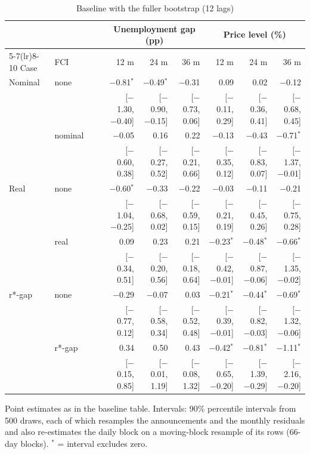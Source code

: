 \begin{table}[H]\centering\footnotesize\setlength{\tabcolsep}{2.2pt}
\caption{Baseline with the fuller bootstrap (12 lags)}\label{tab:fullboot}
\begin{tabular}{llcrrrrrrr}\toprule
 & & & & \multicolumn{3}{c}{Unemployment gap (pp)} & \multicolumn{3}{c}{Price level (\%)}\\ \cmidrule(lr){5-7}\cmidrule(lr){8-10}
Case & FCI & & & 12 m & 24 m & 36 m & 12 m & 24 m & 36 m\\ \midrule
Nominal & none & & & $-$0.81$^{*}$ & $-$0.49$^{*}$ & $-$0.31 & 0.09 & 0.02 & $-$0.12\\
 & & & & {\scriptsize [$-$1.30, $-$0.40]} & {\scriptsize [$-$0.90, $-$0.15]} & {\scriptsize [$-$0.73, 0.06]} & {\scriptsize [$-$0.11, 0.29]} & {\scriptsize [$-$0.36, 0.41]} & {\scriptsize [$-$0.68, 0.45]}\\
 & nominal & & & $-$0.05 & 0.16 & 0.22 & $-$0.13 & $-$0.43 & $-$0.71$^{*}$\\
 & & & & {\scriptsize [$-$0.60, 0.38]} & {\scriptsize [$-$0.27, 0.52]} & {\scriptsize [$-$0.21, 0.66]} & {\scriptsize [$-$0.35, 0.12]} & {\scriptsize [$-$0.83, 0.07]} & {\scriptsize [$-$1.37, $-$0.01]}\\
\addlinespace
Real & none & & & $-$0.60$^{*}$ & $-$0.33 & $-$0.22 & $-$0.03 & $-$0.11 & $-$0.21\\
 & & & & {\scriptsize [$-$1.04, $-$0.25]} & {\scriptsize [$-$0.68, 0.02]} & {\scriptsize [$-$0.59, 0.15]} & {\scriptsize [$-$0.21, 0.19]} & {\scriptsize [$-$0.45, 0.26]} & {\scriptsize [$-$0.75, 0.28]}\\
 & real & & & 0.09 & 0.23 & 0.21 & $-$0.23$^{*}$ & $-$0.48$^{*}$ & $-$0.66$^{*}$\\
 & & & & {\scriptsize [$-$0.34, 0.51]} & {\scriptsize [$-$0.20, 0.56]} & {\scriptsize [$-$0.18, 0.64]} & {\scriptsize [$-$0.42, $-$0.01]} & {\scriptsize [$-$0.87, $-$0.06]} & {\scriptsize [$-$1.35, $-$0.02]}\\
\addlinespace
r*-gap & none & & & $-$0.29 & $-$0.07 & 0.03 & $-$0.21$^{*}$ & $-$0.44$^{*}$ & $-$0.69$^{*}$\\
 & & & & {\scriptsize [$-$0.77, 0.12]} & {\scriptsize [$-$0.58, 0.34]} & {\scriptsize [$-$0.52, 0.48]} & {\scriptsize [$-$0.39, $-$0.01]} & {\scriptsize [$-$0.82, $-$0.03]} & {\scriptsize [$-$1.32, $-$0.06]}\\
 & r*-gap & & & 0.34 & 0.50 & 0.43 & $-$0.42$^{*}$ & $-$0.81$^{*}$ & $-$1.11$^{*}$\\
 & & & & {\scriptsize [$-$0.15, 0.85]} & {\scriptsize [$-$0.01, 1.19]} & {\scriptsize [$-$0.08, 1.32]} & {\scriptsize [$-$0.65, $-$0.20]} & {\scriptsize [$-$1.39, $-$0.29]} & {\scriptsize [$-$2.16, $-$0.20]}\\
\bottomrule\end{tabular}
\par\smallskip\parbox{0.96\linewidth}{\scriptsize Point estimates as in the baseline table. Intervals: 90\% percentile intervals from 500 draws, each of which resamples the announcements and the monthly residuals and also re-estimates the daily block on a moving-block resample of its rows (66-day blocks). $^{*}$ = interval excludes zero.}
\end{table}
